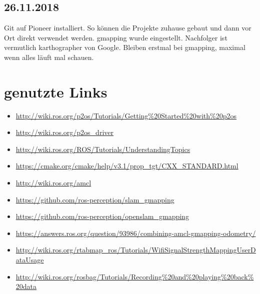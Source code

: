 \documentclass{scrartcl}%
\begin{document}
\subsection{26.11.2018}
Git auf Pioneer installiert. So können die Projekte zuhause gebaut und dann vor Ort direkt verwendet werden. gmapping wurde eingestellt. Nachfolger ist vermutlich karthographer von Google. Bleiben erstmal bei gmapping, maximal wenn alles läuft mal schauen.

\section{genutzte Links}
\begin{itemize}
	\item \url{http://wiki.ros.org/p2os/Tutorials/Getting%20Started%20with%20p2os}
		\item \url{http://wiki.ros.org/p2os_driver}
		\item \url{http://wiki.ros.org/ROS/Tutorials/UnderstandingTopics}
		\item \url{https://cmake.org/cmake/help/v3.1/prop_tgt/CXX_STANDARD.html}
		\item \url{http://wiki.ros.org/amcl}
		\item \url{https://github.com/ros-perception/slam\_gmapping}
		\item \url{https://github.com/ros-perception/openslam\_gmapping}
		\item \url{https://answers.ros.org/question/93986/combining-amcl-gmapping-odometry/}
		\item \url{http://wiki.ros.org/rtabmap_ros/Tutorials/WifiSignalStrengthMappingUserDataUsage}
		\item \url{http://wiki.ros.org/rosbag/Tutorials/Recording%20and%20playing%20back%20data}
	\end{itemize}
\end{document}
